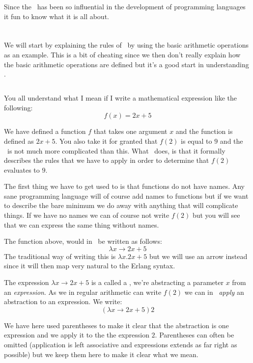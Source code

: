 \documentclass[a4paper,11pt]{article}
\begin{document}
Since the \lamc\ has been so influential in the development of
programming languages it fun to know what it is all about.

\section{\lamc}

We will start by explaining the rules of \lamc\ by using the basic
arithmetic operations as an example. This is a bit of cheating since we
then don't really explain how the basic arithmetic operations are
defined but it's a good start in understanding \lamc.

\subsection{\lama}

You all understand what I mean if I write a mathematical expression
like the following:$$f(x) = 2x + 5$$

We have defined a function $f$ that takes one argument $x$ and the
function is defined as $2x + 5$. You also take it for granted that
$f(2)$ is equal to $9$ and the \lamc\ is not much more complicated
than this. What \lamc\ does, is that it formally describes the rules
that we have to apply in order to determine that $f(2)$ evaluates to
$9$.

The first thing we have to get used to is that functions do not have
names. Any sane programming language will of course add names to
functions but if we want to describe the bare minimum we do away with
anything that will complicate things. If we have no names we can of
course not write $f(2)$ but you will see that we can express the same
thing without names.

The function above, would in \lamc\ be written as
follows:$$\lambda x \rightarrow 2x + 5$$The traditional way of writing
this is $\lambda x.2x+5$ but we will use an arrow instead since it
will then map very natural to the Erlang syntax. 

The expression $\lambda x \rightarrow 2x + 5$ is a called a {\em
  \lama}, we're abstracting a parameter $x$ from an {\em
  expression}. As we in regular arithmetic can write $f(2)$ we can in
\lamc\ {\em apply} an abstraction to an expression. We
write: $$(\lambda x \rightarrow 2x + 5) 2$$

We have here used parentheses to make it clear that the abstraction is
one expression and we apply it to the the expression $2$. Parentheses
can often be omitted (application is left associative and expressions
extends as far right as possible) but we keep them here to make it
clear what we mean.
\end{document}
